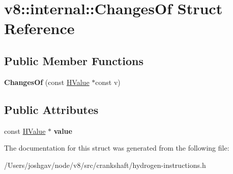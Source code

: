 \hypertarget{structv8_1_1internal_1_1_changes_of}{}\section{v8\+:\+:internal\+:\+:Changes\+Of Struct Reference}
\label{structv8_1_1internal_1_1_changes_of}
\subsection*{Public Member Functions}
\begin{DoxyCompactItemize}
\item 
{\bfseries Changes\+Of} (const \hyperlink{classv8_1_1internal_1_1_h_value}{H\+Value} $\ast$const v)\hypertarget{structv8_1_1internal_1_1_changes_of_aa1c661bbd92bcabc8d6185d51ec2d776}{}\label{structv8_1_1internal_1_1_changes_of_aa1c661bbd92bcabc8d6185d51ec2d776}

\end{DoxyCompactItemize}
\subsection*{Public Attributes}
\begin{DoxyCompactItemize}
\item 
const \hyperlink{classv8_1_1internal_1_1_h_value}{H\+Value} $\ast$ {\bfseries value}\hypertarget{structv8_1_1internal_1_1_changes_of_a89b2136ab2622bb87d43e26b86da0d10}{}\label{structv8_1_1internal_1_1_changes_of_a89b2136ab2622bb87d43e26b86da0d10}

\end{DoxyCompactItemize}


The documentation for this struct was generated from the following file\+:\begin{DoxyCompactItemize}
\item 
/\+Users/joshgav/node/v8/src/crankshaft/hydrogen-\/instructions.\+h\end{DoxyCompactItemize}
